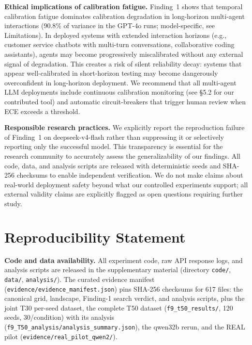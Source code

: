 \documentclass[11pt]{article}
\theoremstyle{definition}
\theoremstyle{remark}
\begin{document}
\textbf{Ethical implications of calibration fatigue.} Finding~1 shows that temporal calibration fatigue dominates calibration degradation in long-horizon multi-agent interactions (90.8\% of variance in the GPT-4o runs; model-specific, see Limitations). In deployed systems with extended interaction horizons (e.g., customer service chatbots with multi-turn conversations, collaborative coding assistants), agents may become progressively miscalibrated without any external signal of degradation. This creates a risk of silent reliability decay: systems that appear well-calibrated in short-horizon testing may become dangerously overconfident in long-horizon deployment. We recommend that all multi-agent LLM deployments include continuous calibration monitoring (see \S5.2 for our contributed tool) and automatic circuit-breakers that trigger human review when ECE exceeds a threshold.

\textbf{Responsible research practices.} We explicitly report the reproduction failure of Finding~1 on deepseek-v4-flash rather than suppressing it or selectively reporting only the successful model. This transparency is essential for the research community to accurately assess the generalizability of our findings. All code, data, and analysis scripts are released with deterministic seeds and SHA-256 checksums to enable independent verification. We do not make claims about real-world deployment safety beyond what our controlled experiments support; all external validity claims are explicitly flagged as open questions requiring further study.

\section*{Reproducibility Statement}

\textbf{Code and data availability.} All experiment code, raw API response logs, and analysis scripts are released in the supplementary material (directory \texttt{code/}, \texttt{data/}, \texttt{analysis/}). The curated evidence manifest (\texttt{evidence/evidence\_manifest.json}) pins SHA-256 checksums for 617 files: the canonical grid, landscape, Finding-1 search verdict, and analysis scripts, plus the joint T30 per-seed dataset, the complete T50 dataset (\texttt{f9\_t50\_results/}, 120 seeds, 30/condition) with its analysis (\texttt{f9\_T50\_analysis/analysis\_summary.json}), the qwen32b rerun, and the REAL pilot (\texttt{evidence/real\_pilot\_qwen2/}).
\end{document}
